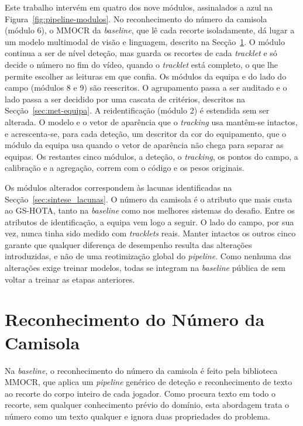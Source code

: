 Este trabalho intervém em quatro dos nove módulos, assinalados a azul na Figura~\ref{fig:pipeline-modulos}. No reconhecimento do número da camisola (módulo 6), o MMOCR da \emph{baseline}, que lê cada recorte isoladamente, dá lugar a um modelo multimodal de visão e linguagem, descrito na Secção~\ref{sec:met-jnr}. O módulo continua a ser de nível deteção, mas guarda os recortes de cada \emph{tracklet} e só decide o número no fim do vídeo, quando o \emph{tracklet} está completo, o que lhe permite escolher as leituras em que confia. Os módulos da equipa e do lado do campo (módulos 8 e 9) são reescritos. O agrupamento passa a ser auditado e o lado passa a ser decidido por uma cascata de critérios, descritos na Secção~\ref{sec:met-equipa}. A reidentificação (módulo 2) é estendida sem ser alterada. O modelo e o vetor de aparência que o \emph{tracking} usa mantêm-se intactos, e acrescenta-se, para cada deteção, um descritor da cor do equipamento, que o módulo da equipa usa quando o vetor de aparência não chega para separar as equipas. Os restantes cinco módulos, a deteção, o \emph{tracking}, os pontos do campo, a calibração e a agregação, correm com o código e os pesos originais.

Os módulos alterados correspondem às lacunas identificadas na Secção~\ref{sec:sintese_lacunas}. O número da camisola é o atributo que mais custa ao GS-HOTA, tanto na \emph{baseline} como nos melhores sistemas do desafio. Entre os atributos de identificação, a equipa vem logo a seguir. O lado do campo, por sua vez, nunca tinha sido medido com \emph{tracklets} reais. Manter intactos os outros cinco garante que qualquer diferença de desempenho resulta das alterações introduzidas, e não de uma reotimização global do \emph{pipeline}. Como nenhuma das alterações exige treinar modelos, todas se integram na \emph{baseline} pública de \citet{somers2024soccernet} sem voltar a treinar as etapas anteriores.



\section{Reconhecimento do Número da Camisola}\label{sec:met-jnr}

Na \emph{baseline}, o reconhecimento do número da camisola é feito pela biblioteca MMOCR, que aplica um \emph{pipeline} genérico de deteção e reconhecimento de texto ao recorte do corpo inteiro de cada jogador. Como procura texto em todo o recorte, sem qualquer conhecimento prévio do domínio, esta abordagem trata o número como um texto qualquer e ignora duas propriedades do problema.

